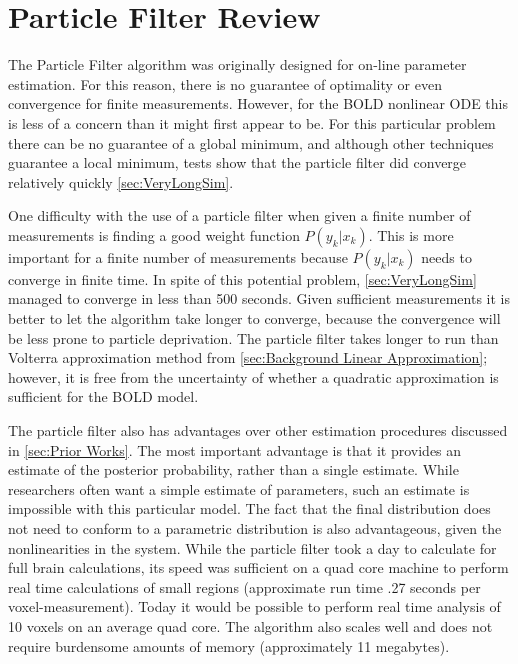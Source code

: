 \section{Particle Filter Review}
The Particle Filter algorithm was originally designed for on-line parameter 
estimation. For this reason, there is no guarantee of optimality or even 
convergence for finite measurements. However, for the BOLD nonlinear ODE 
this is less of a concern than it might first appear to be. For this
particular problem there can be no guarantee of a global minimum, and although
other techniques guarantee a local minimum, tests show that the particle
filter did converge relatively quickly \autoref{sec:VeryLongSim}.

One difficulty
with the use of a particle filter when given a finite number of measurements is finding
a good weight function $P(y_k | x_k)$. This is more important for a finite
number of measurements because $P(y_k | x_k)$ needs to converge in finite time.
In spite of this potential problem, \autoref{sec:VeryLongSim} managed
to converge in less than 500 seconds.  Given sufficient
measurements it is better to let the algorithm take longer to converge, because the
convergence will be less prone to particle deprivation. The particle filter takes longer
to run than Volterra approximation method from \autoref{sec:Background Linear Approximation};
however, it is free from the uncertainty of whether a quadratic approximation is 
sufficient for the BOLD model. 

The particle filter also has advantages over other estimation procedures
discussed in \autoref{sec:Prior Works}. The most important advantage is that it provides
an estimate of the posterior probability, rather than a single estimate. While researchers
often want a simple estimate of parameters, such an estimate is impossible with this particular
model. The fact that the final distribution does not need to conform to a
parametric distribution is also advantageous, given the nonlinearities in the system.
While the particle filter took a day to calculate for full brain calculations, its speed
was sufficient on a quad core machine to perform real time calculations of small regions
(approximate run time .27 seconds per voxel-measurement). Today it would be possible
 to perform real time analysis of 10 voxels on an average quad core. The algorithm also scales
well and does not require burdensome amounts of memory (approximately 11 megabytes). 

